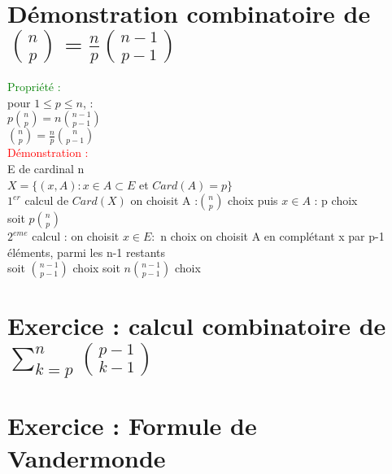 \documentclass{article}
\begin{document}
\section{Démonstration combinatoire de $\binom{n}{p}= \frac n p \binom{n-1}{p-1}$}
\textcolor{green}{Propriété :} \\
pour $1 \leq p \leq n$, : \\
$p\binom{n}{p} = n \binom{n-1}{p-1}$ \\
$\binom n p = \frac n p \binom{n}{p-1}$ \\
\textcolor{red}{Démonstration : } \\
E de cardinal n \\
$X= \lbrace (x,A) : x \in A \subset E$ et $Card(A)=p \rbrace$ \\
$1^{er}$ calcul de $Card(X)$ on choisit A :$\binom{n}{p}$ choix puis $x\in A$ : p choix \\
soit $p \binom n p$ \\
$2^{eme}$ calcul : on choisit $x \in E :$ n choix on choisit A en complétant x par p-1 éléments, parmi les n-1 restants \\
soit $\binom{n-1}{p-1}$ choix soit $n\binom{n-1}{p-1}$ choix \\
\section{Exercice : calcul combinatoire de $\sum_{k=p}^n \binom{p-1}{k-1} $ }
\section{ Exercice : Formule de Vandermonde}
\end{document}
